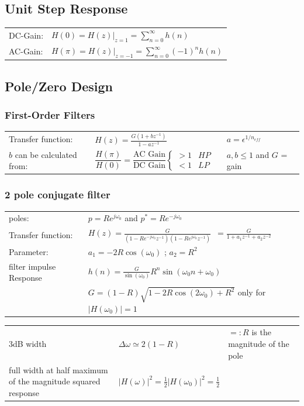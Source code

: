 \subsection{Unit Step Response}
\begin{tabularx}{1\textwidth}{l X}
	DC-Gain: & $H(0) = H(z)|_{z=1}= \sum\limits_{n=0}^{\infty}h(n) $
	\\
	AC-Gain: & $H(\pi) = H(z)|_{z=-1}= \sum\limits_{n=0}^{\infty}(-1)^n h(n) $
\end{tabularx}


\subsection{Pole/Zero Design}
\subsubsection{First-Order Filters }
  \begin{tabular}{llp{2cm}l}
    Transfer function: &
    $H(z) = \frac{G(1+bz^{-1})}{1-az^{-1}}$ & &
    $a = \epsilon^{1/n_{eff}}$ \\
    $b$ can be calculated from: &
    $\dfrac{H(\pi)}{H(0)} = \dfrac{\text{AC Gain}}{\text{DC Gain}} \left\lbrace \begin{matrix}
      >1 & HP \\
      <1 & LP
    \end{matrix}\right.$ & &
    $a,b \leq 1$ and $G$ = gain
  \end{tabular}

\subsubsection{2 pole conjugate filter}

\begin{tabularx}{1\textwidth}{l X}
	poles: & $ p = R e^{j\omega_0}$ \qquad and \qquad $ p^* = R e^{-j\omega_0}$
	\\ 
	Transfer function: & $H(z)= \frac{G}{(1-R e^{-j\omega_0}z^{-1})(1-Re^{j\omega_0}z^{-1})}$\
	$=\frac{G}{1+a_1z^{-1}+a_2z^{-2}}$
	\\
	Parameter: & $a_1 = -2R\cos(\omega_0)$ \qquad; \qquad $a_2 = R^2$
	\\ 
	filter impulse Response & $h(n) = \frac{G}{\sin(\omega_0)}R^n \sin(\omega_0 n + \omega_0)$
	\\ 
	& $G = (1-R)\sqrt{1-2R\cos(2\omega_0)+ R^2}$ \quad only for $|H(\omega_0)| = 1$
\end{tabularx}
\begin{tabularx}{1\textwidth}{Xll}
	3dB width & $\Delta\omega \simeq 2(1-R)$ & $=:R$ is the magnitude of the pole \\
	full width at half maximum of the magnitude squared response & $|H(\omega)|^2=\frac{1}{2}|H(\omega_0)|^2=\frac{1}{2}$&
\end{tabularx}

